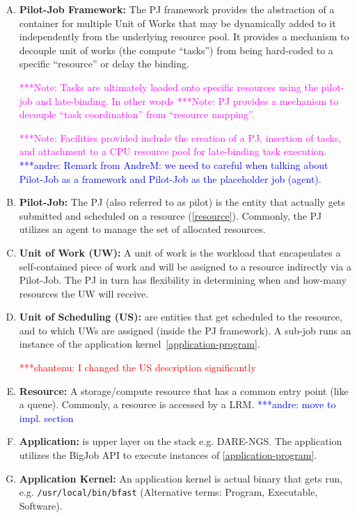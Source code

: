 \documentclass[conference,final]{IEEEtran}
\newcommand{\jhanote}[1]{ {\textcolor{red} { ***shantenu: #1 }}}
\newcommand{\alnote}[1]{ {\textcolor{blue} { ***andre: #1 }}}
\newcommand{\note}[1]{ {\textcolor{magenta} { ***Note: #1 }}}
\newcommand{\alnote}[1]{}
\newcommand{\jhanote}[1]{}
\newcommand{\note}[1]{}
\begin{document}
\begin{enumerate}[A.]

\item \textbf{Pilot-Job Framework:} The PJ framework provides the abstraction of 
a container for multiple Unit of Works that may be dynamically added to it 
independently from the underlying resource pool.  It provides a mechanism to 
decouple unit of works (the compute ``tasks'') from being  hard-coded to a 
specific ``resource'' or delay the binding. 

  \note{Tasks are ultimately loaded onto specific resources using the
    pilot-job and late-binding. In other words} \note{PJ provides a
    mechanism to decouple “task coordination” from “resource
    mapping”.}

  \note{Facilities provided include the creation of a PJ, insertion of
    tasks, and attachment to a CPU resource pool for late-binding task
    execution.}
	\alnote{Remark from AndreM: we need to careful when talking about Pilot-Job 
	as a framework and Pilot-Job as the placeholder job (agent).}

\item \textbf{Pilot-Job:} The PJ (also referred to as pilot) is the entity that 
actually gets submitted and scheduled on a resource (\ref{resource}). Commonly, 
the PJ utilizes an agent to manage the set of allocated resources.

\item \textbf{Unit of Work (UW):} A unit of work is the workload that 
    encapsulates a self-contained piece of work and will be assigned to a 
    resource indirectly via a Pilot-Job.  The PJ in turn has flexibility in 
    determining when and how-many resources the UW will receive.

\item \textbf{Unit of Scheduling (US):} are entities 
  that get scheduled to the resource, and to which UWs are assigned
  (inside the PJ framework). A sub-job runs an instance of the application
  kernel~\ref{application-program}.


\jhanote{I changed the US description significantly} 


\item \textbf{Resource:} A storage/compute resource that has a common
  entry point (like a queue). Commonly, a resource is accessed by a 
  LRM. \alnote{move to impl. section} \label{resource}

\item \textbf{Application:} is upper layer on the stack
  e.g. DARE-NGS. The application utilizes the BigJob API to execute
  instances of \ref{application-program}. \label{application}

\item \textbf{Application Kernel:} An application kernel is actual
  binary that gets run, e.g. \texttt{/usr/local/bin/bfast}
  (Alternative terms: Program, Executable,
  Software). \label{application-program}
	
\end{enumerate}
\end{document}
